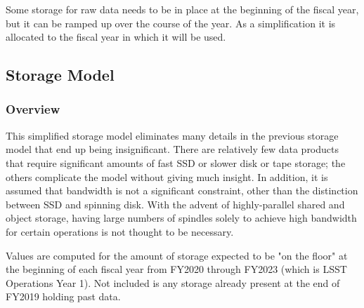 Some storage for raw data needs to be in place at the beginning of the fiscal year, but it can be ramped up over the course of the year.
As a simplification it is allocated to the fiscal year in which it will be used.

\subsection{Storage Model}



\subsubsection{Overview}

This simplified storage model eliminates many details in the previous storage model  that end up being insignificant.
There are relatively few data products that require significant amounts of fast SSD or slower disk or tape storage; the others complicate the model without giving much insight.
In addition, it is assumed that bandwidth is not a significant constraint, other than the distinction between SSD and spinning disk.
With the advent of highly-parallel shared and object storage, having large numbers of spindles solely to achieve high bandwidth for certain operations is not thought to be necessary.

Values are computed for the amount of storage expected to be "on the floor" at the beginning of each fiscal year from FY2020 through FY2023 (which is LSST Operations Year 1).
Not included is any storage already present at the end of FY2019 holding past data.


